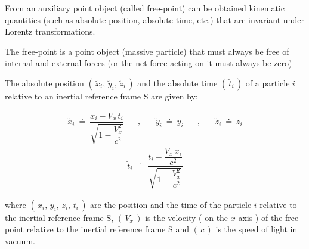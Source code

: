 \documentclass[10pt,fleqn]{article}
\begin{document}
\noindent From an auxiliary point object (called free-point) can be obtained kinematic quantities (such as absolute position, absolute time, etc.) that are invariant under Lorentz transformations.
\par \bigskip \smallskip
\noindent The free-point is a point object (massive particle) that must always be free of internal and external forces (or the net force acting on it must always be zero)
\par \bigskip \smallskip
\noindent The absolute position $( \, \breve{x}_i, \, \breve{y}_i, \, \breve{z}_i \, )$ and the absolute time $( \, \breve{t}_i \, )$ of a particle $i$ relative to an inertial reference frame S are given by:
\par \vspace{+0.30em}
\begin{eqnarray*}
\breve{x}_i ~\doteq~ \dfrac{x_i - V_x \, t_i}{\sqrt{1 - \dfrac{V_x^2}{c^2}}} \;\;\;\;\;\; , \;\;\;\;\;\; \breve{y}_i ~\doteq~ y_i \;\;\;\;\;\; , \;\;\;\;\;\; \breve{z}_i ~\doteq~ z_i
\end{eqnarray*}
\vspace{+0.60em}
\begin{eqnarray*}
\breve{t}_i ~\doteq~ \dfrac{t_i - \dfrac{V_x \, x_i}{c^2}}{\sqrt{1 - \dfrac{V_x^2}{c^2}}}
\end{eqnarray*}
\par \vspace{+1.50em}
\noindent where $( \, x_i, \, y_i, \, z_i, \, t_i \, )$ are the position and the time of the particle $i$ relative to the inertial reference frame S, $( \, V_x \, )$ is the velocity ( on the $x$ axis ) of the free-point relative to the inertial reference frame S and $( \, c \, )$ is the speed of light in vacuum.

\newpage

\par {}

\bigskip \smallskip
\end{document}
